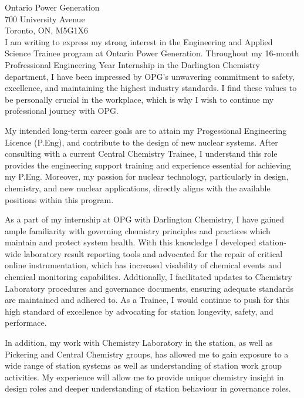 \documentclass[11pt]{FDUletter}
\begin{document}
\begin{letter}{
    Ontario Power Generation \\
    700 University Avenue\\
    Toronto, ON, M5G1X6 \\
}
I am writing to express my strong interest in the Engineering and Applied Science Trainee program at Ontario Power Generation. Throughout my 16-month Profressional Engineering Year Internship in the Darlington Chemistry department, I have been impressed by OPG's unwavering commitment to safety, excellence, and maintaining the highest industry standards. I find these values to be personally crucial in the workplace, which is why I wish to continue my professional journey with OPG.



My intended long-term career goals are to attain my Progessional Engineering Licence (P.Eng), and contribute to the design of new nuclear systems. After consulting with a current Central Chemistry Trainee, I understand this role provides the engineering support training and experience essential for achieving my P.Eng. Moreover, my passion for nuclear technology, particularly in design, chemistry, and new nuclear applications, directly aligns with the available positions within this program.

As a part of my internship at OPG with Darlington Chemistry, I have gained ample familiarity with governing chemistry principles and practices which maintain and protect system health. With this knowledge I developed station-wide laboratory result reporting tools and advocated for the repair of critical online instrumentation, which has increased visability of chemical events and chemical monitoring capabilites. Addtionally, I facilitated updates to Chemistry Laboratory procedures and governance documents, ensuring adequate standards are maintained and adhered to. As a Trainee, I would continue to push for this high standard of excellence by advocating for station longevity, safety, and performace.

In addition, my work with Chemistry Laboratory in the station, as well as Pickering and Central Chemistry groups, has allowed me to gain exposure to a wide range of station systems as well as understanding of station work group activities. My experience will allow me to provide unique chemistry insight in design roles and deeper understanding of station behaviour in governance roles.


\end{letter}
\end{document}

